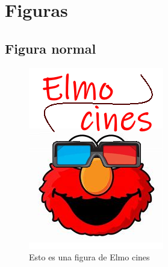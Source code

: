\documentclass{article}
\begin{document}
    \newpage

\section{Figuras}
    \subsection{Figura normal}
        \begin{figure}[ht] %
            \centering
            \includegraphics[scale=0.5]{./ElmoCines.png} %
            \caption{Esto es una figura de Elmo cines}
            \label{fig:Elmo cines}
        \end{figure}
    
\end{document}

